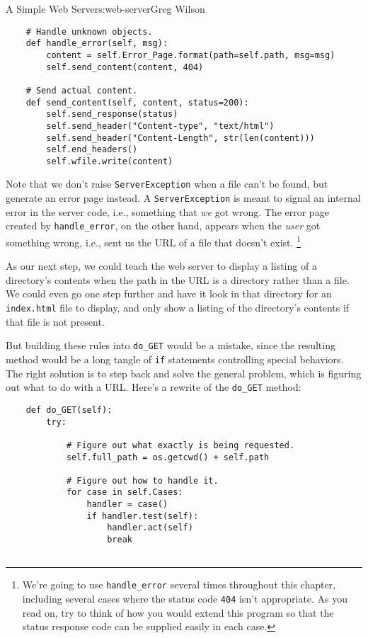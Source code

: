 \begin{aosachapter}{A Simple Web Server}{s:web-server}{Greg Wilson}
\begin{verbatim}
    # Handle unknown objects.
    def handle_error(self, msg):
        content = self.Error_Page.format(path=self.path, msg=msg)
        self.send_content(content, 404)

    # Send actual content.
    def send_content(self, content, status=200):
        self.send_response(status)
        self.send_header("Content-type", "text/html")
        self.send_header("Content-Length", str(len(content)))
        self.end_headers()
        self.wfile.write(content)
\end{verbatim}

Note that we don't raise \texttt{ServerException} when a file can't be
found, but generate an error page instead. A \texttt{ServerException} is
meant to signal an internal error in the server code, i.e., something
that \emph{we} got wrong. The error page created by
\texttt{handle\_error}, on the other hand, appears when the \emph{user}
got something wrong, i.e., sent us the URL of a file that doesn't exist.
\footnote{We're going to use \texttt{handle\_error} several times
  throughout this chapter, including several cases where the status code
  \texttt{404} isn't appropriate. As you read on, try to think of how
  you would extend this program so that the status response code can be
  supplied easily in each case.}

\label{listing-directories}

As our next step, we could teach the web server to display a listing of
a directory's contents when the path in the URL is a directory rather
than a file. We could even go one step further and have it look in that
directory for an \texttt{index.html} file to display, and only show a
listing of the directory's contents if that file is not present.

But building these rules into \texttt{do\_GET} would be a mistake, since
the resulting method would be a long tangle of \texttt{if} statements
controlling special behaviors. The right solution is to step back and
solve the general problem, which is figuring out what to do with a URL.
Here's a rewrite of the \texttt{do\_GET} method:

\begin{verbatim}
    def do_GET(self):
        try:

            # Figure out what exactly is being requested.
            self.full_path = os.getcwd() + self.path

            # Figure out how to handle it.
            for case in self.Cases:
                handler = case()
                if handler.test(self):
                    handler.act(self)
                    break


\end{verbatim}
\end{aosachapter}
